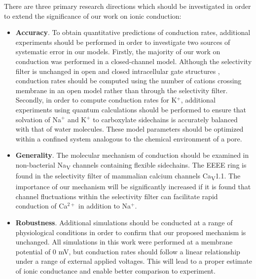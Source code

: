 \begin{refsection}
There are three primary research directions which should be investigated in order to extend the significance of our work on ionic conduction:
\begin{itemize}
\item \textbf{Accuracy}. To obtain quantitative predictions of conduction rates, additional experiments should be performed in order to investigate two sources of systematic error in our models. Firstly, the majority of our work on conduction was performed in a closed-channel model. Although the selectivity filter is unchanged in open and closed intracellular gate structures \cite{McCusker:2012di}, conduction rates should be computed using the number of cations crossing membrane in an open model rather than through the selectivity filter. Secondly, in order to compute conduction rates for K$^+$, additional experiments using quantum calculations should be performed to ensure that solvation of Na$^+$ and K$^+$ to carboxylate sidechains is accurately balanced with that of water molecules. These model parameters should be optimized within a confined system analogous to the chemical environment of a pore.
\item \textbf{Generality}. The molecular mechanism of conduction should be examined in non-bacterial Na\textsubscript{V} channels containing flexible sidechains. The EEEE ring is found in the selectivity filter of mammalian calcium channels Ca\textsubscript{V}1.1. The importance of our mechanism will be significantly increased if it is found that channel fluctuations within the selectivity filter can facilitate rapid conduction of Ca$^{2+}$ in addition to Na$^+$.
\item \textbf{Robustness}. Additional simulations should be conducted at a range of physiological conditions in order to confirm that our proposed mechanism is unchanged. All simulations in this work were performed at a membrane potential of 0 mV, but conduction rates should follow a linear relationship under a range of external applied voltages. This will lead to a proper estimate of ionic conductance and enable better comparison to experiment.
\end{itemize}


\end{refsection}
